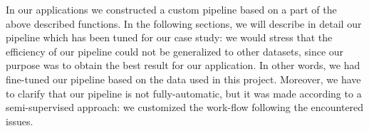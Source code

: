 \documentclass{standalone}
\begin{document}
In our applications we constructed a custom pipeline based on a part of the above described functions.
In the following sections, we will describe in detail our pipeline which has been tuned for our case study: we would stress that the efficiency of our pipeline could not be generalized to other datasets, since our purpose was to obtain the best result for our application.
In other words, we had fine-tuned our pipeline based on the data used in this project.
Moreover, we have to clarify that our pipeline is not fully-automatic, but it was made according to a semi-supervised approach: we customized the work-flow following the encountered issues.
\end{document}
